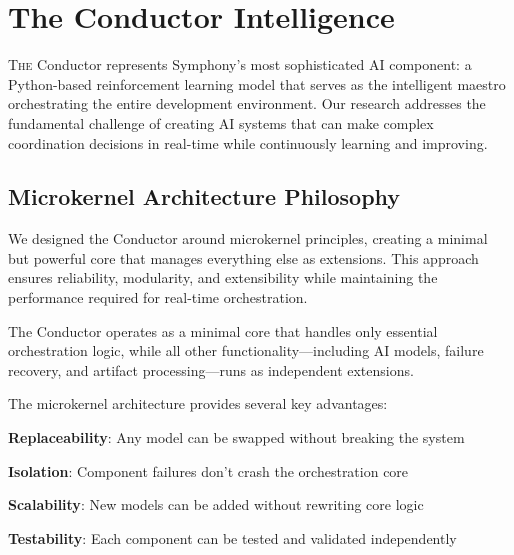 
\section*{The Conductor Intelligence}

\lettrine{T}{he} Conductor represents Symphony's most sophisticated AI component: a Python-based reinforcement learning model that serves as the intelligent maestro orchestrating the entire development environment. Our research addresses the fundamental challenge of creating AI systems that can make complex coordination decisions in real-time while continuously learning and improving.

\subsection*{Microkernel Architecture Philosophy}

We designed the Conductor around microkernel principles, creating a minimal but powerful core that manages everything else as extensions. This approach ensures reliability, modularity, and extensibility while maintaining the performance required for real-time orchestration.

\begin{infobox}[title=Microkernel Design Principles]
The Conductor operates as a minimal core that handles only essential orchestration logic, while all other functionality—including AI models, failure recovery, and artifact processing—runs as independent extensions.
\end{infobox}

The microkernel architecture provides several key advantages:

\begin{compactlist}
    \item \textbf{Replaceability}: Any model can be swapped without breaking the system
    \item \textbf{Isolation}: Component failures don't crash the orchestration core
    \item \textbf{Scalability}: New models can be added without rewriting core logic
    \item \textbf{Testability}: Each component can be tested and validated independently
\end{compactlist}

